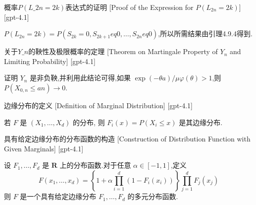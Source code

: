 \documentclass[UTF8]{ctexart}
\begin{document}
    
    
    \begin{prf}
        [Proof-of-the-Expression-for-$PL-{2n}-=-2k$]
        {概率$P(L\_{2n} = 2k)$表达式的证明}
        [Proof of the Expression for $P(L_{2n} = 2k)$]
        [gpt-4.1]
        
$P(L_{2n} = 2k) = P(S_{2k} = 0, S_{2k+1} 
eq 0, \dots, S_{2n} 
eq 0)$,所以所需结果由引理4.9.4得到.

    \end{prf}
    
    
    
    \begin{thm}
        {关于$Y\_n$的鞅性及极限概率的定理}
        [Theorem on Martingale Property of $Y_n$ and Limiting Probability]
        [gpt-4.1]
        
证明 $Y_n$ 是非负鞅,并利用此结论可得,如果 $\exp(-\theta a)/\mu\varphi(\theta)>1$,则 $P(X_{0,n}\leq an)\to 0$.

    \end{thm}
    
    
    
    \begin{dfn}
        {边缘分布的定义}
        [Definition of Marginal Distribution]
        [gpt-4.1]
        
若 $F$ 是 $( X _ { 1 } , \ldots , X _ { d } )$ 的分布, 则 $F _ { i } ( x ) = P ( X _ { i } \leq x )$ 是其边缘分布.

    \end{dfn}
    
    
    
    \begin{thm}
        {具有给定边缘分布的分布函数的构造}
        [Construction of Distribution Function with Given Marginals]
        [gpt-4.1]
        
设 $F _ { 1 } , \ldots , F _ { d }$ 是 $\mathbf { R }$ 上的分布函数.对于任意 $\alpha \in [ - 1 , 1 ]$,定义
\[
F ( x _ { 1 } , \dots , x _ { d } ) = \left\{ 1 + \alpha \prod _ { i = 1 } ^ { d } ( 1 - F _ { i } ( x _ { i } ) ) \right\} \prod _ { j = 1 } ^ { d } F _ { j } ( x _ { j } )
\]
则 $F$ 是一个具有给定边缘分布 $F _ 1 , \ldots , F _ d$ 的多元分布函数.

    \end{thm}
    
    
    
\end{document}
